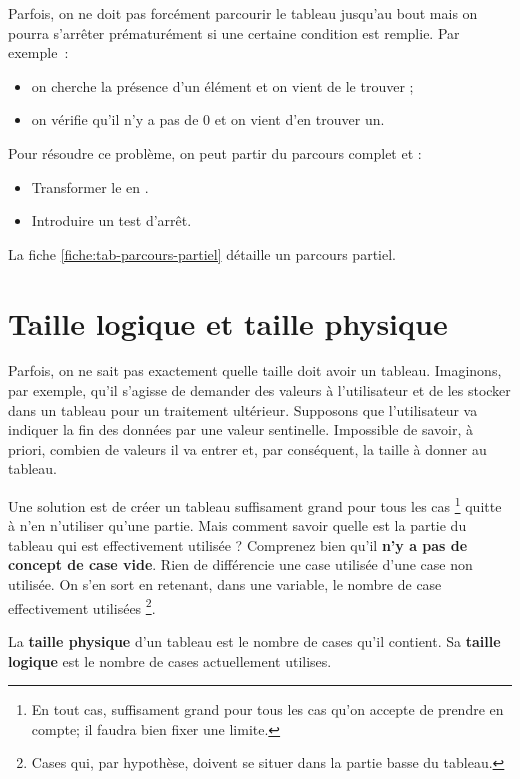 			Parfois, on ne doit pas forcément parcourir 
			le tableau jusqu'au bout
			mais on pourra s'arrêter prématurément 
			si une certaine condition est remplie.
			Par exemple~:
			\begin{itemize}
			\item on cherche la présence d'un élément et on vient de le trouver ;
			\item on vérifie qu'il n'y a pas de $0$ et on vient d'en trouver un.
			\end{itemize}

			Pour résoudre ce problème,
			on peut partir du parcours complet et :
			\begin{itemize}
			\item
				Transformer le  en .
			\item
				Introduire un test d'arrêt.
			\end{itemize}
			La fiche \vref{fiche:tab-parcours-partiel}
			détaille un parcours partiel.

	\section{Taille logique et taille physique} 

		Parfois, on ne sait pas exactement 
		quelle taille doit avoir un tableau.
		Imaginons, par exemple,
		qu'il s'agisse de demander des valeurs à l'utilisateur
		et de les stocker dans un tableau pour un traitement ultérieur.
		Supposons que l'utilisateur va indiquer la fin des données
		par une valeur sentinelle.
		Impossible de savoir, à priori, combien de valeurs il va entrer
		et, par conséquent, la taille à donner au tableau.
		
		Une solution est de créer un tableau suffisament grand
		pour tous les cas%
		\footnote{%
			En tout cas, 
			suffisament grand pour tous les cas qu'on accepte
			de prendre en compte; il faudra bien fixer une limite.
		} 
		quitte à n'en n'utiliser qu'une partie.
		Mais comment savoir quelle est la partie du tableau
		qui est effectivement utilisée ?
		Comprenez bien qu'il \textbf{n'y a pas de concept de case vide}.
		Rien de différencie une case utilisée d'une case non utilisée.
		On s'en sort en retenant, dans une variable,
		le nombre de case effectivement utilisées%
		\footnote{%
			Cases qui, par hypothèse, doivent se situer dans la partie basse
			du tableau.
		}.
		
		La \textbf{taille physique} d'un tableau 
		est le nombre de cases qu'il contient.
		Sa \textbf{taille logique}
		est le nombre de cases actuellement utilises.
		
